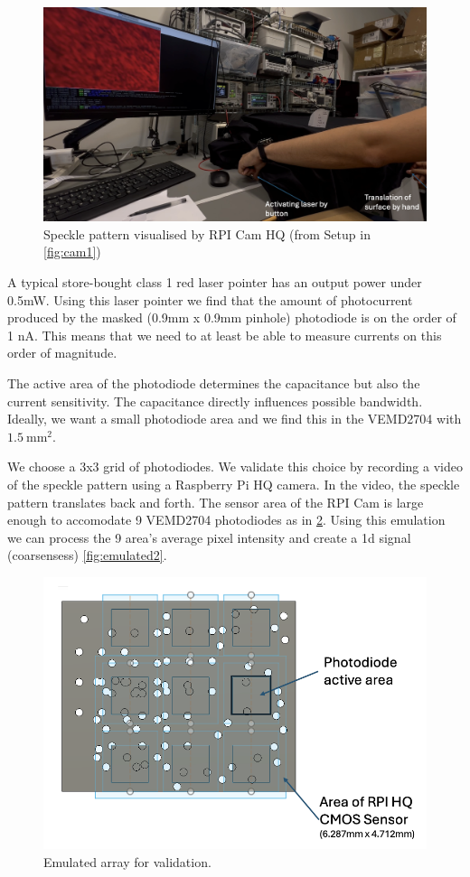 \begin{figure}[t]
  \centering
  \includegraphics[width=\widthnarrow]{figures/impl/camera_setup2.png}
  \caption{Speckle pattern visualised by RPI Cam HQ (from Setup in \ref{fig:cam1})}
  \label{fig:cam2}
\end{figure}

A typical store-bought class 1 red laser pointer has an output power under 0.5mW. Using this laser pointer we find that the amount of photocurrent produced by the masked (0.9mm x 0.9mm pinhole) photodiode is on the order of 1 nA. This means that we need to at least be able to measure currents on this order of magnitude.

The active area of the photodiode determines the capacitance but also the current sensitivity. The capacitance directly influences possible bandwidth. Ideally, we want a small photodiode area and we find this in the VEMD2704 with $\SI{1.5}{\milli\meter\squared}$.

We choose a 3x3 grid of photodiodes. We validate this choice by recording a video of the speckle pattern using a Raspberry Pi HQ camera. In the video, the speckle pattern translates back and forth. The sensor area of the RPI Cam is large enough to accomodate 9 VEMD2704 photodiodes as in \ref{fig:emulated1}. Using this emulation we can process the 9 area's average pixel intensity and create a 1d signal (coarsensess) 
\ref{fig:emulated2}.

\begin{figure}[t]
  \centering
  \includegraphics[width=\widthnarrow]{figures/impl/emulated1.png}
  \caption{Emulated array for validation.}
  \label{fig:emulated1}
\end{figure}



